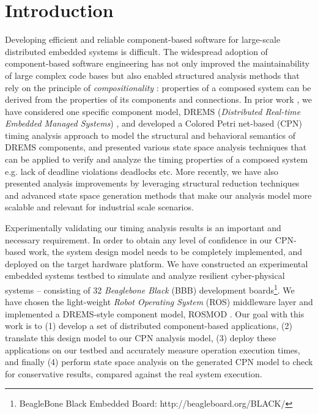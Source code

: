 \section{Introduction}

Developing efficient and reliable component-based software for large-scale distributed embedded systems is difficult. The widespread adoption of component-based software engineering has not only improved the maintainability of large complex code bases but also enabled structured analysis methods that rely on the principle of \emph{compositionality} \cite{jifeng2005component}: properties of a composed system can be derived from the properties of its components and connections. In prior work \cite{kumar2014colored}, we have considered one specific component model, DREMS (\emph{Distributed Real-time Embedded Managed Systems}) \cite{DREMS13Software}, and developed a Colored Petri net-based (CPN) \cite{CPN} timing analysis approach to model the structural and behavioral semantics of DREMS components, and presented various state space analysis techniques that can be applied to verify and analyze the timing properties of a composed system e.g. lack of deadline violations deadlocks etc. More recently, we have also presented \cite{SEUS} analysis improvements by leveraging structural reduction techniques and advanced state space generation methods that make our analysis model more scalable and relevant for industrial scale scenarios. 

Experimentally validating our timing analysis results is an important and necessary requirement. In order to obtain any level of confidence in our CPN-based work, the system design model needs to be completely implemented, and deployed on the target hardware platform. We have constructed an experimental embedded systems testbed \cite{kumarTestbed} to simulate and analyze resilient cyber-physical systems -- consisting of 32 \emph{Beaglebone Black} (BBB) development boards\footnote{BeagleBone Black Embedded Board: http://beagleboard.org/BLACK/}. We have chosen the light-weight \emph{Robot Operating System} (ROS) \cite{ROS} middleware layer and implemented a DREMS-style component model, ROSMOD \cite{kumarROSMOD}. Our goal with this work is to (1) develop a set of distributed component-based applications, (2) translate this design model to our CPN analysis model, (3) deploy these applications on our testbed and accurately measure operation execution times, and finally (4) perform state space analysis on the generated CPN model to check for conservative results, compared against the real system execution.

